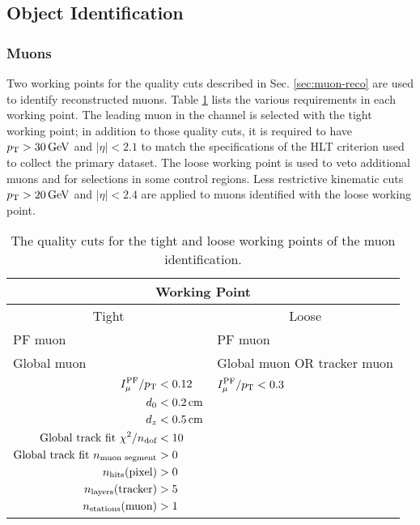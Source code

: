 \subsection{Object Identification}

\subsubsection{Muons
\label{sec:muon-obj}}

Two working points for the quality cuts described in Sec. \ref{sec:muon-reco} are used to identify reconstructed muons. Table \ref{tab:muonWP} lists the various requirements in each working point. The leading muon in the \mutau channel is selected with the tight working point; in addition to those quality cuts, it is required to have $p_{\mathrm{T}}>30\,\text{Ge\hspace{-.08em}V}$ and $|\eta|<2.1$ to match the specifications of the HLT criterion used to collect the primary dataset. The loose working point is used to veto additional muons and for selections in some control regions. Less restrictive kinematic cuts $p_{\mathrm{T}}>20\,\text{Ge\hspace{-.08em}V}$ and $|\eta|<2.4$ are applied to muons identified with the loose working point.

\begin{table}[htb]
  \begin{center}
    \begin{tabular}{|l|l|}
\hline
\multicolumn{2}{|c|}{Working Point}\\
\hline
\multicolumn{1}{|c|}{Tight} & \multicolumn{1}{c|}{Loose} \\
\hline
PF muon & PF muon \\
Global muon & Global muon OR tracker muon \\
$\begin{aligned}
I^{\text{PF}}_{\mu}/p_{\mathrm{T}} &< 0.12 \\
d_0 &< 0.2\,\text{cm} \\
d_z &< 0.5\,\text{cm} \\
\text{Global track fit } \chi^2/n_{\text{dof}} &< 10 \\
\text{Global track fit } n_{\text{muon segment}} &> 0 \\
n_{\text{hits}}(\text{pixel}) &> 0 \\
n_{\text{layers}}(\text{tracker}) &> 5 \\
n_{\text{stations}}(\text{muon}) &> 1
\end{aligned}$
&
$\begin{aligned}
I^{\text{PF}}_{\mu}/p_{\mathrm{T}} &< 0.3 \\
\\
\\
\\
\\
\\
\\
\\
\end{aligned}$ \\
\hline
    \end{tabular}
    \caption{The quality cuts for the tight and loose working points of the muon identification.}
    \label{tab:muonWP}
  \end{center}
\end{table}

